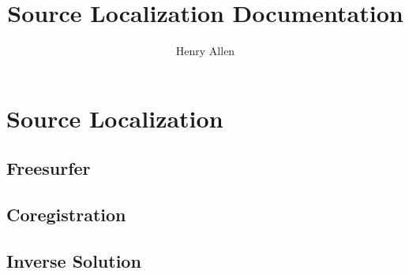 \documentclass[12pt]{article}
\title{Source Localization Documentation}
\author{Henry Allen}
\begin{document}
\maketitle

\section{Source Localization}
\subsection{Freesurfer}

\subsection{Coregistration}

\subsection{Inverse Solution}
    
\end{document}
